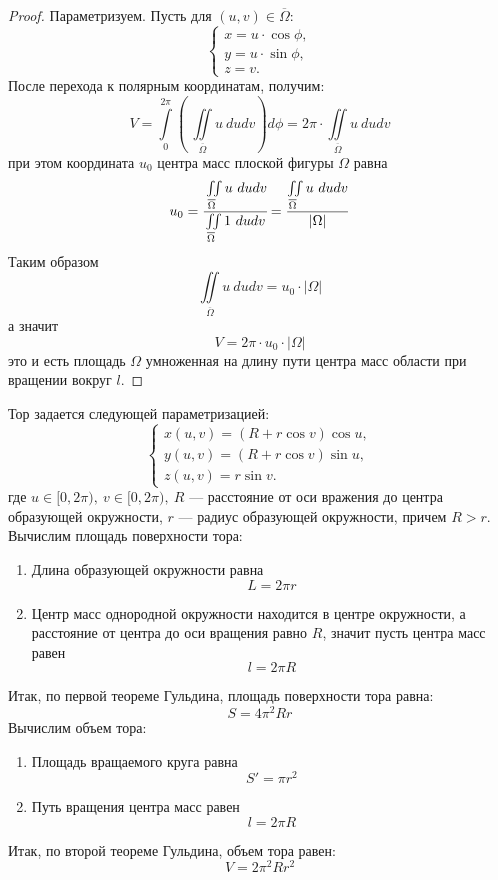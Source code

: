 \begin{proof}
    Параметризуем. Пусть для $(u,v)\in \overline{\Omega}$:
    \[\begin{cases}
        x=u\cdot \cos{\phi},\\
        y=u\cdot \sin{\phi},\\
        z=v.
    \end{cases}\]
    После перехода к полярным координатам, получим:
    \[V=\int\limits_{0}^{2\pi}\left(\ \iint\limits_{\overline{\Omega}}u\ dudv\right)d\phi=2\pi\cdot \iint\limits_{\overline{\Omega}}u\ dudv\]
    при этом координата $u_0$ центра масс плоской фигуры $\Omega$ равна
    \[u_0=\cfrac{\iint\limits_{\overline{\Omega}}u\ dudv}{\iint\limits_{\overline{\Omega}}1\ dudv}=\frac{\iint\limits_{\overline{\Omega}}u\ dudv}{|\Omega|}\]
    Таким образом
    \[\iint\limits_{\overline{\Omega}}u\ dudv=u_0\cdot |\Omega|\]
    а значит
    \[V=2\pi\cdot u_0\cdot |\Omega|\]
    это и есть площадь $\Omega$ умноженная на длину пути центра масс области при вращении вокруг $l$.
\end{proof}
\begin{example}
    Тор задается следующей параметризацией:
    \[\begin{cases}
        x(u,v)=(R+r\cos{v})\cos{u},\\
        y(u,v)=(R+r\cos{v})\sin{u},\\
        z(u,v)=r\sin{v}.
    \end{cases}\]
    где $u\in [0,2\pi),\ v\in [0,2\pi),\ R$ --- расстояние от оси вражения до центра образующей окружности, $r$ --- радиус образующей окружности, причем $R>r$. Вычислим площадь поверхности тора:
    \begin{enumerate}
        \item Длина образующей окружности равна
        \[L=2\pi r\]
        \item Центр масс однородной окружности находится в центре окружности, а расстояние от центра до оси вращения равно $R$, значит пусть центра масс равен
        \[l=2\pi R\]
    \end{enumerate}
    Итак, по первой теореме Гульдина, площадь поверхности тора равна:
    \[S=4\pi^2 Rr\]
    Вычислим объем тора:
    \begin{enumerate}
        \item Площадь вращаемого круга равна
        \[S'=\pi r^2\]
        \item Путь вращения центра масс равен
        \[l=2\pi R\]
    \end{enumerate}
    Итак, по второй теореме Гульдина, объем тора равен:
    \[V=2\pi^2 R r^2\]
\end{example}
\newpage